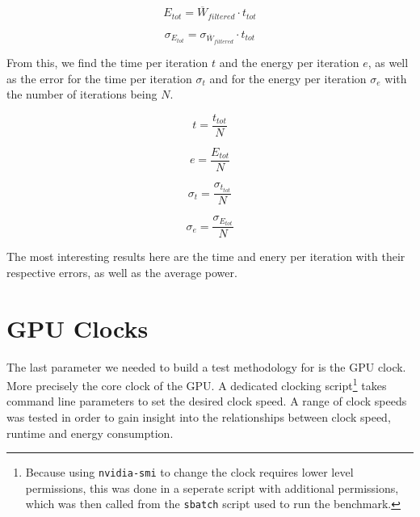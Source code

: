 \begin{equation}
E_{tot} = \overline{W}_{filtered} \cdot t_{tot}
\end{equation}

\begin{equation}
\sigma_{E_{tot}} = \sigma_{\overline{W}_{filtered}} \cdot t_{tot}
\end{equation}

From this, we find the time per iteration \( t \) and the energy per iteration \( e \), as well as the error for the time per iteration \( \sigma_t \) and for the energy per iteration \( \sigma_e \) with the number of iterations being \( N \).

\begin{equation}
t = \frac{t_{tot}}{N}
\end{equation}

\begin{equation}
e = \frac{E_{tot}}{N}
\end{equation}

\begin{equation}
\sigma_t = \frac{\sigma_{t_{tot}}}{N}
\end{equation}

\begin{equation}
\sigma_e = \frac{\sigma_{E_{tot}}}{N}
\end{equation}

The most interesting results here are the time and enery per iteration with their respective errors, as well as the average power.


\section{GPU Clocks}
The last parameter we needed to build a test methodology for is the GPU clock. More precisely the core clock of the GPU. A dedicated clocking script\footnote{Because using \texttt{nvidia-smi} to change the clock requires lower level permissions, this was done in a seperate script with additional permissions, which was then called from the \texttt{sbatch} script used to run the benchmark.} takes command line parameters to set the desired clock speed. A range of clock speeds was tested in order to gain insight into the relationships between clock speed, runtime and energy consumption.